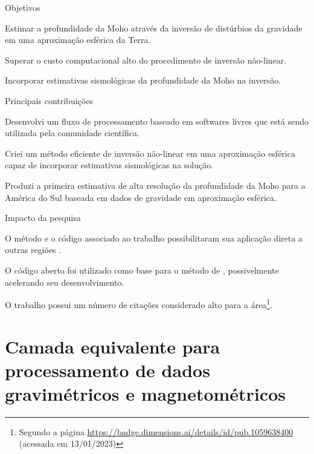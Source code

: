 \documentclass[12pt,a4paper,oneside]{book}
\begin{document}
\begin{fancyenum}{\faBullseye}{Objetivos}
  \item Estimar a profundidade da Moho através da inversão de distúrbios da
    gravidade em uma aproximação esférica da Terra.
  \item Superar o custo computacional alto do procedimento de inversão
    não-linear.
  \item Incorporar estimativas sismológicas da profundidade da Moho na inversão.
\end{fancyenum}
\begin{fancyenum}{\faLightbulb}{Principais contribuições}
  \item Desenvolvi um fluxo de processamento baseado em softwares livres que
    está sendo utilizada pela comunidade científica.
  \item Criei um método eficiente de inversão não-linear em uma aproximação
    esférica capaz de incorporar estimativas sismológicas na solução.
  \item Produzi a primeira estimativa de alta resolução da profundidade da Moho
    para a América do Sul baseada em dados de gravidade em aproximação
    esférica.
\end{fancyenum}
\begin{fancyenum}{\faRocket}{Impacto da pesquisa}
  \item O método e o código associado ao trabalho \citet{Uieda2017}
    possibilitaram sua aplicação direta a outras regiões \citep[e.g.,][entre
    outros]{Chisenga2019, Sobh2020, KemgangGhomsi2021}.
  \item O código aberto foi utilizado como base para o método de
    \citet{Haas2020}, possivelmente acelerando seu desenvolvimento.
  \item O trabalho \citet{Uieda2017} possui um número de citações considerado
    alto para a área\footnote{Segundo a página
    \url{https://badge.dimensions.ai/details/id/pub.1059638400} (acessada em
    13/01/2023)}.
\end{fancyenum}


\section{Camada equivalente para processamento de dados gravimétricos e magnetométricos}
\label{sec_eql}
\end{document}

